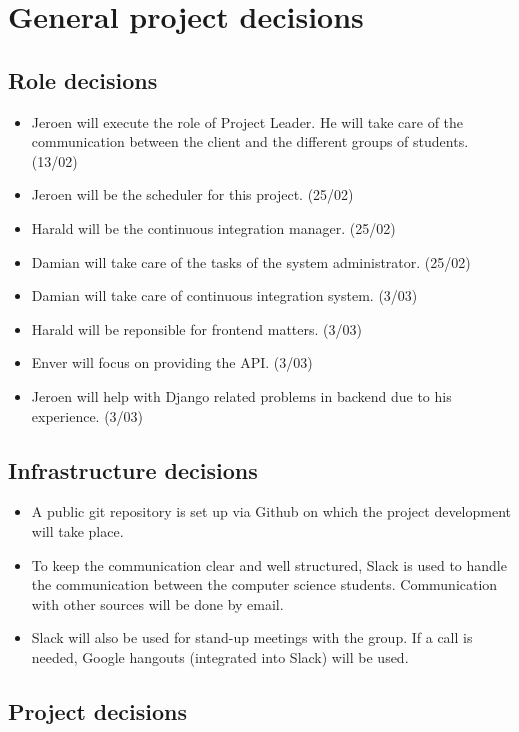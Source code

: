 \chapter{General project decisions}

\section{Role decisions}

\begin{itemize}
 \item Jeroen will execute the role of Project Leader. He will take care of the communication between the client and the different groups of students. (13/02)
 \item Jeroen will be the scheduler for this project. (25/02)
 \item Harald will be the continuous integration manager. (25/02)
 \item Damian will take care of the tasks of the system administrator. (25/02)
 \item Damian will take care of continuous integration system. (3/03)
 \item Harald will be reponsible for frontend matters. (3/03)
 \item Enver will focus on providing the API. (3/03)
 \item Jeroen will help with Django related problems in backend due to his experience. (3/03)
\end{itemize}


\section{Infrastructure decisions}
\begin{itemize}
	\item A public git repository is set up via Github on which the project development will take place.
    \item To keep the communication clear and well structured, Slack is used to handle the communication between the computer science students. Communication with other sources will be done by email.
    \item Slack will also be used for stand-up meetings with the group. If a call is needed, Google hangouts (integrated into Slack) will be used.
\end{itemize}

\section{Project decisions}
